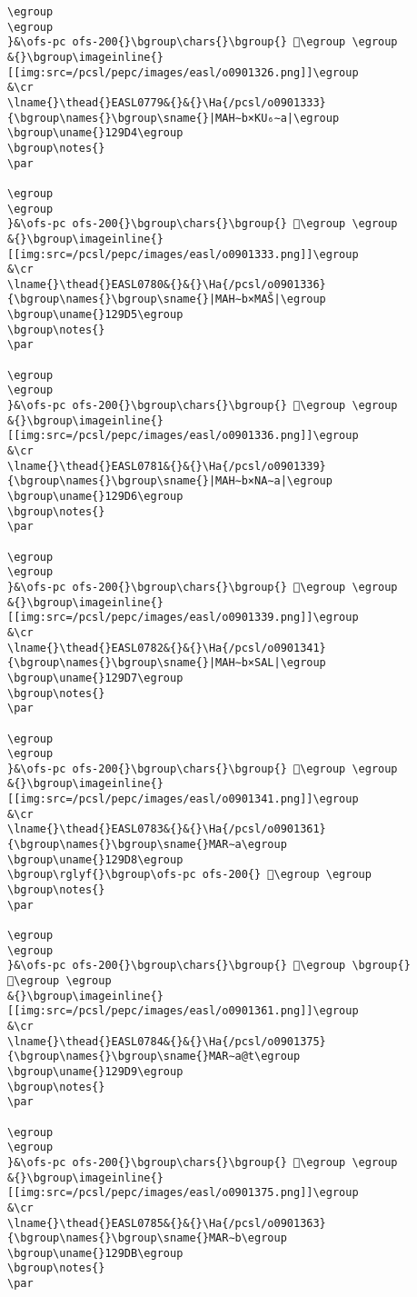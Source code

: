 \begin{verbatim}
\egroup
\egroup
}&\ofs-pc ofs-200{}\bgroup\chars{}\bgroup{} 𒧓\egroup \egroup
&{}\bgroup\imageinline{}[[img:src=/pcsl/pepc/images/easl/o0901326.png]]\egroup
&\cr
\lname{}\thead{}EASL0779&{}&{}\Ha{/pcsl/o0901333}{\bgroup\names{}\bgroup\sname{}|MAH∼b×KU₆∼a|\egroup
\bgroup\uname{}129D4\egroup
\bgroup\notes{}
\par 

\egroup
\egroup
}&\ofs-pc ofs-200{}\bgroup\chars{}\bgroup{} 𒧔\egroup \egroup
&{}\bgroup\imageinline{}[[img:src=/pcsl/pepc/images/easl/o0901333.png]]\egroup
&\cr
\lname{}\thead{}EASL0780&{}&{}\Ha{/pcsl/o0901336}{\bgroup\names{}\bgroup\sname{}|MAH∼b×MAŠ|\egroup
\bgroup\uname{}129D5\egroup
\bgroup\notes{}
\par 

\egroup
\egroup
}&\ofs-pc ofs-200{}\bgroup\chars{}\bgroup{} 𒧕\egroup \egroup
&{}\bgroup\imageinline{}[[img:src=/pcsl/pepc/images/easl/o0901336.png]]\egroup
&\cr
\lname{}\thead{}EASL0781&{}&{}\Ha{/pcsl/o0901339}{\bgroup\names{}\bgroup\sname{}|MAH∼b×NA∼a|\egroup
\bgroup\uname{}129D6\egroup
\bgroup\notes{}
\par 

\egroup
\egroup
}&\ofs-pc ofs-200{}\bgroup\chars{}\bgroup{} 𒧖\egroup \egroup
&{}\bgroup\imageinline{}[[img:src=/pcsl/pepc/images/easl/o0901339.png]]\egroup
&\cr
\lname{}\thead{}EASL0782&{}&{}\Ha{/pcsl/o0901341}{\bgroup\names{}\bgroup\sname{}|MAH∼b×SAL|\egroup
\bgroup\uname{}129D7\egroup
\bgroup\notes{}
\par 

\egroup
\egroup
}&\ofs-pc ofs-200{}\bgroup\chars{}\bgroup{} 𒧗\egroup \egroup
&{}\bgroup\imageinline{}[[img:src=/pcsl/pepc/images/easl/o0901341.png]]\egroup
&\cr
\lname{}\thead{}EASL0783&{}&{}\Ha{/pcsl/o0901361}{\bgroup\names{}\bgroup\sname{}MAR∼a\egroup
\bgroup\uname{}129D8\egroup
\bgroup\rglyf{}\bgroup\ofs-pc ofs-200{} 𒧘\egroup \egroup
\bgroup\notes{}
\par 

\egroup
\egroup
}&\ofs-pc ofs-200{}\bgroup\chars{}\bgroup{} 𒧘\egroup \bgroup{} 𒧚\egroup \egroup
&{}\bgroup\imageinline{}[[img:src=/pcsl/pepc/images/easl/o0901361.png]]\egroup
&\cr
\lname{}\thead{}EASL0784&{}&{}\Ha{/pcsl/o0901375}{\bgroup\names{}\bgroup\sname{}MAR∼a@t\egroup
\bgroup\uname{}129D9\egroup
\bgroup\notes{}
\par 

\egroup
\egroup
}&\ofs-pc ofs-200{}\bgroup\chars{}\bgroup{} 𒧙\egroup \egroup
&{}\bgroup\imageinline{}[[img:src=/pcsl/pepc/images/easl/o0901375.png]]\egroup
&\cr
\lname{}\thead{}EASL0785&{}&{}\Ha{/pcsl/o0901363}{\bgroup\names{}\bgroup\sname{}MAR∼b\egroup
\bgroup\uname{}129DB\egroup
\bgroup\notes{}
\par 


\end{verbatim}
